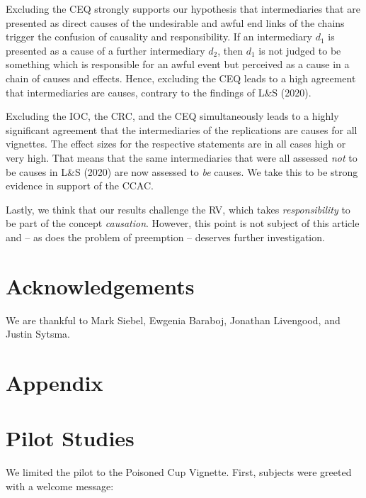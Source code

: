 \documentclass[egregdoesnotlikesansseriftitles,12pt]{scrartcl}
\begin{document}
Excluding the CEQ strongly supports our hypothesis that intermediaries that are presented as direct causes of the undesirable and awful end links of the chains trigger the confusion of causality and responsibility. If an intermediary $d_{1}$ is presented as a cause of a further intermediary $d_{2}$, then $d_{1}$ is not judged to be something which is responsible for an awful event but perceived as a cause in a chain of causes and effects. Hence, excluding the CEQ leads to a high agreement that intermediaries are causes, contrary to the findings of L\&S (2020).

Excluding the IOC, the CRC, and the CEQ simultaneously leads to a highly significant agreement that the intermediaries of the replications are causes for all vignettes. The effect sizes for the respective statements are in all cases high or very high. That means that the same intermediaries that were all assessed \textit{not} to be causes in L\&S (2020) are now assessed to \textit{be} causes. We take this to be strong evidence in support of the CCAC.

Lastly, we think that our results challenge the RV, which takes \textit{responsibility} to be part of the concept \textit{causation}. However, this point is not subject of this article and -- as does the problem of preemption -- deserves further investigation.


\section{Acknowledgements}
We are thankful to Mark Siebel, Ewgenia Baraboj, Jonathan Livengood, and Justin Sytsma.   


\clearpage
\printbibliography

\clearpage
\section*{Appendix}
\appendix
\section{Pilot Studies}\label{app:pilot}
We limited the pilot to the Poisoned Cup Vignette. First, subjects were greeted with a welcome message:
\end{document}
